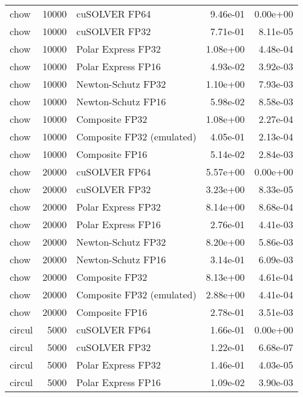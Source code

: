 \begin{table}
\begin{tabular}{lrlrr}
     chow & 10000 &             cuSOLVER FP64 &  9.46e-01 &        0.00e+00 \\
     chow & 10000 &             cuSOLVER FP32 &  7.71e-01 &        8.11e-05 \\
     chow & 10000 &        Polar Express FP32 &  1.08e+00 &        4.48e-04 \\
     chow & 10000 &        Polar Express FP16 &  4.93e-02 &        3.92e-03 \\
     chow & 10000 &        Newton-Schutz FP32 &  1.10e+00 &        7.93e-03 \\
     chow & 10000 &        Newton-Schutz FP16 &  5.98e-02 &        8.58e-03 \\
     chow & 10000 &            Composite FP32 &  1.08e+00 &        2.27e-04 \\
     chow & 10000 & Composite FP32 (emulated) &  4.05e-01 &        2.13e-04 \\
     chow & 10000 &            Composite FP16 &  5.14e-02 &        2.84e-03 \\
     chow & 20000 &             cuSOLVER FP64 &  5.57e+00 &        0.00e+00 \\
     chow & 20000 &             cuSOLVER FP32 &  3.23e+00 &        8.33e-05 \\
     chow & 20000 &        Polar Express FP32 &  8.14e+00 &        8.68e-04 \\
     chow & 20000 &        Polar Express FP16 &  2.76e-01 &        4.41e-03 \\
     chow & 20000 &        Newton-Schutz FP32 &  8.20e+00 &        5.86e-03 \\
     chow & 20000 &        Newton-Schutz FP16 &  3.14e-01 &        6.09e-03 \\
     chow & 20000 &            Composite FP32 &  8.13e+00 &        4.61e-04 \\
     chow & 20000 & Composite FP32 (emulated) &  2.88e+00 &        4.41e-04 \\
     chow & 20000 &            Composite FP16 &  2.78e-01 &        3.51e-03 \\
   circul &  5000 &             cuSOLVER FP64 &  1.66e-01 &        0.00e+00 \\
   circul &  5000 &             cuSOLVER FP32 &  1.22e-01 &        6.68e-07 \\
   circul &  5000 &        Polar Express FP32 &  1.46e-01 &        4.03e-05 \\
   circul &  5000 &        Polar Express FP16 &  1.09e-02 &        3.90e-03 \\

\end{tabular}
\end{table}
